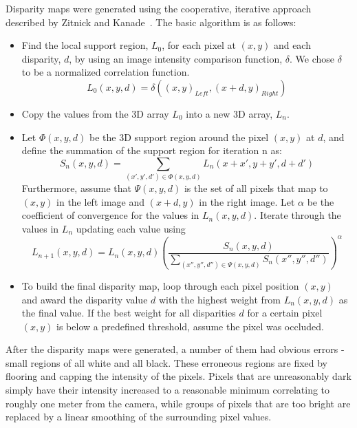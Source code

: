 \documentclass{llncs}
\begin{document}
Disparity maps were generated using the cooperative, iterative approach described by Zitnick and Kanade~\cite{stereo:zitKan}.
The basic algorithm is as follows:
\begin{itemize}
\item Find the local support region, $L_0$, for each pixel at $(x,y)$ and each disparity, $d$, by using an image intensity comparison function, $\delta$.
We chose $\delta$ to be a normalized correlation function.
\begin{equation}
L_0(x,y,d) = \delta((x,y)_{Left}, (x+d,y)_{Right})
\end{equation}
\item Copy the values from the 3D array $L_0$ into a new 3D array, $L_n$.
\item Let $\Phi(x,y,d)$ be the 3D support region around the pixel $(x,y)$ at $d$, and define the summation of the support region for iteration n as:
\begin{equation}
S_n(x,y,d) = \sum_{(x',y',d') \in \Phi(x,y,d)} L_n (x+x', y+y', d+d')
\end{equation}
Furthermore, assume that $\Psi(x,y,d)$ is the set of all pixels that map to $(x,y)$ in the left image and $(x+d,y)$ in the right image. 
Let $\alpha$ be the coefficient of convergence for the values in $L_n(x,y,d)$.  Iterate through the values in $L_n$ updating each value using
\begin{equation}
L_{n+1}(x,y,d) = L_n(x,y,d)\left(\frac{S_n(x,y,d)}{\sum\limits_{(x'',y'',d'') \in \Psi(x,y,d)} S_n(x'',y'',d'')} \right)^\alpha 
\end{equation}
\item To build the final disparity map, loop through each pixel position $(x,y)$ and award the disparity value $d$ with the highest weight from $L_n(x,y,d)$ as the final value.
If the best weight for all disparities $d$ for a certain pixel $(x,y)$ is below a predefined threshold, assume the pixel was occluded.
\end{itemize}

After the disparity maps were generated, a number of them had obvious errors - small regions of all white and all black. These erroneous regions are fixed by flooring and capping the intensity of the pixels. Pixels that are unreasonably dark simply have their intensity increased to a reasonable minimum correlating to roughly one meter from the camera, while groups of pixels that are too bright are replaced by a linear smoothing of the surrounding pixel values. 
\end{document}
